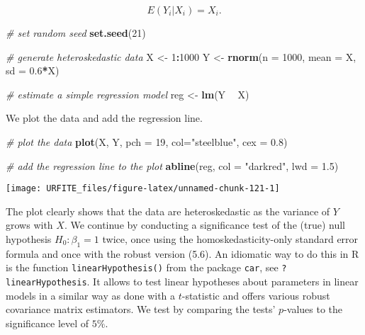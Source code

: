 \documentclass[]{book}
\newenvironment{Shaded}{\begin{snugshade}}{\end{snugshade}}
\newcommand{\KeywordTok}[1]{\textcolor[rgb]{0.13,0.29,0.53}{\textbf{#1}}}
\newcommand{\DataTypeTok}[1]{\textcolor[rgb]{0.13,0.29,0.53}{#1}}
\newcommand{\DecValTok}[1]{\textcolor[rgb]{0.00,0.00,0.81}{#1}}
\newcommand{\FloatTok}[1]{\textcolor[rgb]{0.00,0.00,0.81}{#1}}
\newcommand{\StringTok}[1]{\textcolor[rgb]{0.31,0.60,0.02}{#1}}
\newcommand{\CommentTok}[1]{\textcolor[rgb]{0.56,0.35,0.01}{\textit{#1}}}
\newcommand{\OperatorTok}[1]{\textcolor[rgb]{0.81,0.36,0.00}{\textbf{#1}}}
\newcommand{\NormalTok}[1]{#1}
\theoremstyle{definition}
\theoremstyle{definition}
\theoremstyle{definition}
\theoremstyle{remark}
\begin{document}
\[ E(Y_i\vert X_i) = X_i. \]

\begin{Shaded}
\begin{Highlighting}[]
\CommentTok{# set random seed}
\KeywordTok{set.seed}\NormalTok{(}\DecValTok{21}\NormalTok{)}

\CommentTok{# generate heteroskedastic data }
\NormalTok{X <-}\StringTok{ }\DecValTok{1}\OperatorTok{:}\DecValTok{1000}
\NormalTok{Y <-}\StringTok{ }\KeywordTok{rnorm}\NormalTok{(}\DataTypeTok{n =} \DecValTok{1000}\NormalTok{, }\DataTypeTok{mean =}\NormalTok{ X, }\DataTypeTok{sd =} \FloatTok{0.6}\OperatorTok{*}\NormalTok{X)}

\CommentTok{# estimate a simple regression model}
\NormalTok{reg <-}\StringTok{ }\KeywordTok{lm}\NormalTok{(Y }\OperatorTok{~}\StringTok{ }\NormalTok{X)}
\end{Highlighting}
\end{Shaded}

We plot the data and add the regression line.

\begin{Shaded}
\begin{Highlighting}[]
\CommentTok{# plot the data}
\KeywordTok{plot}\NormalTok{(X, Y, }\DataTypeTok{pch =} \DecValTok{19}\NormalTok{, }\DataTypeTok{col=}\StringTok{"steelblue"}\NormalTok{, }\DataTypeTok{cex =} \FloatTok{0.8}\NormalTok{)}

\CommentTok{# add the regression line to the plot}
\KeywordTok{abline}\NormalTok{(reg, }\DataTypeTok{col =} \StringTok{"darkred"}\NormalTok{, }\DataTypeTok{lwd =} \FloatTok{1.5}\NormalTok{)}
\end{Highlighting}
\end{Shaded}

\begin{center}\texttt{[image: URFITE\_files/figure-latex/unnamed-chunk-121-1]} \end{center}

The plot clearly shows that the data are heteroskedastic as the variance
of \(Y\) grows with \(X\). We continue by conducting a significance test
of the (true) null hypothesis \(H_0: \beta_1 = 1\) twice, once using the
homoskedasticity-only standard error formula and once with the robust
version (5.6). An idiomatic way to do this in R is the function
\texttt{linearHypothesis()} from the package \texttt{car}, see
\texttt{?linearHypothesis}. It allows to test linear hypotheses about
parameters in linear models in a similar way as done with a
\(t\)-statistic and offers various robust covariance matrix estimators.
We test by comparing the tests' \(p\)-values to the significance level
of \(5\%\).
\end{document}
